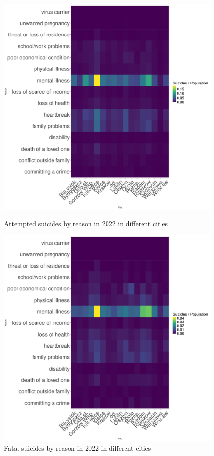 \documentclass{article}
\begin{document}
\begin{figure}[H]
    \centering
    \begin{minipage}{0.45\textwidth}
        \includegraphics[width=\textwidth]{imgs/reason_city_op-att-2022.pdf}
        \caption{Attempted suicides by reason  in 2022 in different cities}
	\label{fig:reason_city_op-att-2022}
    \end{minipage}
    \hfill
    \begin{minipage}{0.45\textwidth}
        \includegraphics[width=\textwidth]{imgs/reason_city_op-fat-2022.pdf}
        \caption{Fatal suicides by reason  in 2022 in different cities}
	\label{fig:reason_city_op-fat-2022}
    \end{minipage}
\end{figure}
\end{document}
